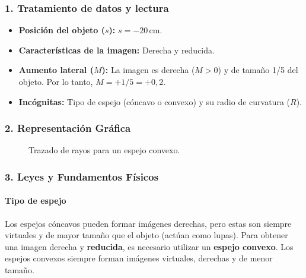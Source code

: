 \subsubsection*{1. Tratamiento de datos y lectura}
\begin{itemize}
    \item \textbf{Posición del objeto ($s$):} $s = -20 \, \text{cm}$.
    \item \textbf{Características de la imagen:} Derecha y reducida.
    \item \textbf{Aumento lateral ($M$):} La imagen es derecha ($M > 0$) y de tamaño 1/5 del objeto. Por lo tanto, $M = +1/5 = +0,2$.
    \item \textbf{Incógnitas:} Tipo de espejo (cóncavo o convexo) y su radio de curvatura ($R$).
\end{itemize}

\subsubsection*{2. Representación Gráfica}
\begin{figure}[H]
    \centering
    \caption{Trazado de rayos para un espejo convexo.}
\end{figure}

\subsubsection*{3. Leyes y Fundamentos Físicos}
\paragraph*{Tipo de espejo}
Los espejos cóncavos pueden formar imágenes derechas, pero estas son siempre virtuales y de mayor tamaño que el objeto (actúan como lupas). Para obtener una imagen derecha y \textbf{reducida}, es necesario utilizar un \textbf{espejo convexo}. Los espejos convexos siempre forman imágenes virtuales, derechas y de menor tamaño.

